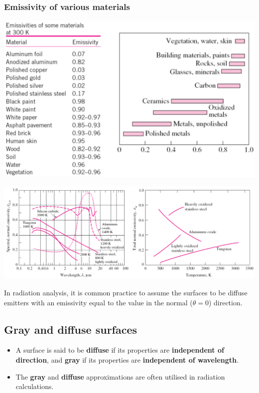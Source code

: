 \documentclass[11pt]{article}
\begin{document}
\subsubsection{Emissivity of various materials}
\label{sec:org2e74472}
\begin{center}
\includegraphics[width=.9\linewidth]{./images/emissivity-of-various-materials-table.png}
\end{center}
\begin{center}
\includegraphics[width=.9\linewidth]{./images/emissivity-of-various-materials-graph.png}
\end{center}

In radiation analysis, it is common practice to assume the surfaces to be diffuse emitters with an emissivity equal to the value in the normal (\(\theta = 0\)) direction.
\subsection{Gray and diffuse surfaces}
\label{sec:org21be568}
\begin{itemize}
\item A surface is said to be \textbf{diffuse} if its properties are \textbf{independent of direction}, and \textbf{gray} if its properties are \textbf{independent of wavelength}.
\item The \textbf{gray} and \textbf{diffuse} approximations are often utilised in radiation calculations.
\end{itemize}
\end{document}
